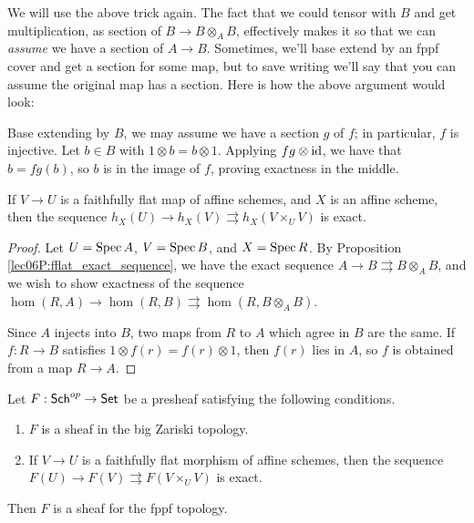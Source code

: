 \begin{remark} \label{lec06R:fflat_extensions}
 We will use the above trick again. The fact that we could tensor with $B$ and get multiplication, as section of $B\to B\otimes_A B$, effectively makes it so that we can \emph{assume} we have a section of $A\to B$. Sometimes, we'll base extend by an fppf cover and get a section for some map, but to save writing we'll say that you can assume the original map has a section. Here is how the above argument would look:

 Base extending by $B$, we may assume we have a section $g$ of $f$; in particular, $f$ is injective. Let $b\in B$ with $1\otimes b = b\otimes 1$. Applying $fg\otimes \operatorname{id}$, we have that $b=fg(b)$, so $b$ is in the image of $f$, proving exactness in the middle.
\end{remark}
\begin{corollary}\label{lec06C:fflat_affine_condition}
 If $V\to U$ is a faithfully flat map of affine schemes, and $X$ is an affine scheme, then the sequence $h_X(U)\to h_X(V)\rightrightarrows h_X(V\times_U V)$ is exact.
\end{corollary}
\begin{proof}
 Let $U=\operatorname{Spec} A$, $V=\operatorname{Spec} B$, and $X=\operatorname{Spec} R$. By Proposition \ref{lec06P:fflat_exact_sequence}, we have the exact sequence $A\to B\rightrightarrows B\otimes_A B$, and we wish to show exactness of the sequence $\hom(R,A)\to \hom(R,B) \rightrightarrows \hom(R,B\otimes_A B)$.

 Since $A$ injects into $B$, two maps from $R$ to $A$ which agree in $B$ are the same. If $f:R\to B$ satisfies $1\otimes f(r)=f(r)\otimes 1$, then $f(r)$ lies in $A$, so $f$ is obtained from a map $R\to A$.
\end{proof}
\begin{lemma}\label{lec06L:zariski+affine_condition=>fppf_sheaf}
 Let $F:\text{\sf Sch}^{op}\to \text{\sf Set}$ be a presheaf satisfying the following conditions.
 \begin{enumerate}
  \item $F$ is a sheaf in the big Zariski topology.
  \item If $V\to U$ is a faithfully flat morphism of affine schemes, then the sequence $F(U)\to F(V)\rightrightarrows F(V\times_U V)$ is exact.
 \end{enumerate}
 Then $F$ is a sheaf for the fppf topology.
\end{lemma}
